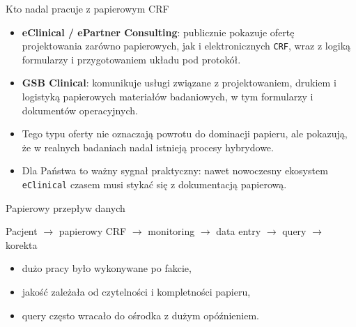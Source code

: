 \begin{frame}{Kto nadal pracuje z papierowym CRF}
  \begin{itemize}
    \item \textbf{eClinical / ePartner Consulting}: publicznie pokazuje ofertę projektowania zarówno papierowych, jak i elektronicznych \texttt{CRF}, wraz z logiką formularzy i przygotowaniem układu pod protokół.
    \item \textbf{GSB Clinical}: komunikuje usługi związane z projektowaniem, drukiem i logistyką papierowych materiałów badaniowych, w tym formularzy i dokumentów operacyjnych.
    \item Tego typu oferty nie oznaczają powrotu do dominacji papieru, ale pokazują, że w realnych badaniach nadal istnieją procesy hybrydowe.
    \item Dla Państwa to ważny sygnał praktyczny: nawet nowoczesny ekosystem \texttt{eClinical} czasem musi stykać się z dokumentacją papierową.
  \end{itemize}
\end{frame}

\begin{frame}{Papierowy przepływ danych}
  \begin{center}
    \Large
    Pacjent $\rightarrow$ papierowy CRF $\rightarrow$ monitoring $\rightarrow$ data entry $\rightarrow$ query $\rightarrow$ korekta
  \end{center}

  \vspace{0.45cm}

  \begin{itemize}
    \item dużo pracy było wykonywane po fakcie,
    \item jakość zależała od czytelności i kompletności papieru,
    \item query często wracało do ośrodka z dużym opóźnieniem.
  \end{itemize}
\end{frame}


